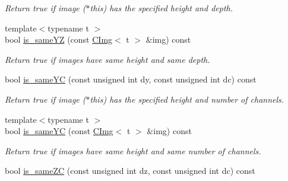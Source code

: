 \begin{DoxyCompactItemize}
\begin{DoxyCompactList}\small\item\em Return {\ttfamily true} if image ($\ast$this) has the specified height and depth. \item\end{DoxyCompactList}\item 
\hypertarget{structcimg__library_1_1CImg_a5d863be6ae8d5d8ab0af39aa78174b2f}{
{\footnotesize template$<$typename t $>$ }\\bool \hyperlink{structcimg__library_1_1CImg_a5d863be6ae8d5d8ab0af39aa78174b2f}{is\_\-sameYZ} (const \hyperlink{structcimg__library_1_1CImg}{CImg}$<$ t $>$ \&img) const }
\label{structcimg__library_1_1CImg_a5d863be6ae8d5d8ab0af39aa78174b2f}

\begin{DoxyCompactList}\small\item\em Return {\ttfamily true} if images have same height and same depth. \item\end{DoxyCompactList}\item 
\hypertarget{structcimg__library_1_1CImg_ace0741498b1434757e9c302f50107605}{
bool \hyperlink{structcimg__library_1_1CImg_ace0741498b1434757e9c302f50107605}{is\_\-sameYC} (const unsigned int dy, const unsigned int dc) const }
\label{structcimg__library_1_1CImg_ace0741498b1434757e9c302f50107605}

\begin{DoxyCompactList}\small\item\em Return {\ttfamily true} if image ($\ast$this) has the specified height and number of channels. \item\end{DoxyCompactList}\item 
\hypertarget{structcimg__library_1_1CImg_a39fea71206b4c4dc9b80575950fc2ece}{
{\footnotesize template$<$typename t $>$ }\\bool \hyperlink{structcimg__library_1_1CImg_a39fea71206b4c4dc9b80575950fc2ece}{is\_\-sameYC} (const \hyperlink{structcimg__library_1_1CImg}{CImg}$<$ t $>$ \&img) const }
\label{structcimg__library_1_1CImg_a39fea71206b4c4dc9b80575950fc2ece}

\begin{DoxyCompactList}\small\item\em Return {\ttfamily true} if images have same height and same number of channels. \item\end{DoxyCompactList}\item 
\hypertarget{structcimg__library_1_1CImg_a43cb088e8e95daa51634d0f8af961efb}{
bool \hyperlink{structcimg__library_1_1CImg_a43cb088e8e95daa51634d0f8af961efb}{is\_\-sameZC} (const unsigned int dz, const unsigned int dc) const }
\label{structcimg__library_1_1CImg_a43cb088e8e95daa51634d0f8af961efb}


\end{DoxyCompactItemize}
